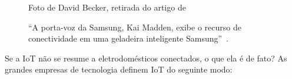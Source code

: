 \documentclass[pdftex, brazil, 12pt, twoside]{article}
\begin{document}
\begin{figure}[h]
  \begin{center}
    \caption{``A porta-voz da Samsung, Kai Madden, exibe o recurso de conectividade em
      uma geladeira inteligente Samsung''~\citep{BajarinIoE2014}.}
    \label{fig:smart-geladeira}

    \footnotesize{Foto de David Becker, retirada do artigo de ~\citet{BajarinIoE2014}}%
  \end{center}
\end{figure}

Se a IoT não se resume a eletrodomésticos conectados, o que ela é de fato? As
grandes empresas de tecnologia definem IoT do seguinte modo:
\end{document}

